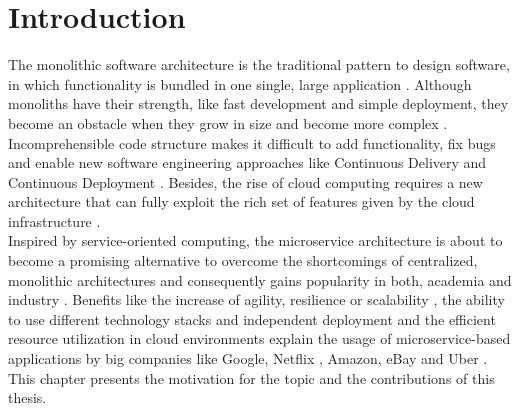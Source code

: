 
\chapter{Introduction}
\label{ch:Introduction}
The monolithic software architecture is the traditional pattern to design software, in which functionality is bundled in one single, large application \cite{DataflowDrivenChen}. Although monoliths have their strength, like fast development and simple deployment, they become an obstacle when they grow in size and become more complex \cite{infoq}. Incomprehensible code structure makes it difficult to add functionality, fix bugs and enable new software engineering approaches like Continuous Delivery and Continuous Deployment \cite{cd}. 
Besides, the rise of cloud computing requires a new architecture that can fully exploit the rich set of features given by the cloud infrastructure \cite{MigratingCloud}. \\
Inspired by service-oriented computing, the microservice architecture is about to become a promising alternative to overcome the shortcomings of centralized, monolithic architectures and consequently gains popularity in both, academia and industry \cite{ObjectAwareAmiri}. Benefits like the increase of agility, resilience or scalability \cite{FunctionalDecompositionHeinrich}, the ability to use different technology stacks and independent deployment \cite{interfaceAnalysisBaresi} and the efficient resource utilization in cloud environments \cite{MigratingCloud} explain the usage of microservice-based applications by big companies like Google, Netflix \cite{DevOps}, Amazon, eBay \cite{DataflowDrivenChen} and Uber \cite{FunctionalDecompositionHeinrich}. \\
This chapter presents the motivation for the topic and the contributions of this thesis.


